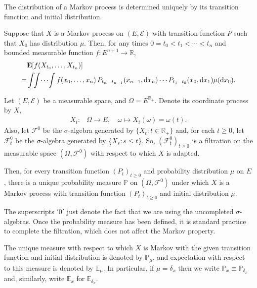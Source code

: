The distribution of a Markov process is determined uniquely by its transition function and initial distribution.

\begin{proposition}
    Suppose that \(X\) is a Markov process on \({(E,\mathcal{E})}\) with transition function \(P\) such that \({X_0}\) has distribution \(\mu\). Then, for any times \({0=t_0<t_1<\cdots<t_n}\) and bounded measurable function \({f\colon E^{n+1}\rightarrow{\mathbb R}}\),
    \begin{align*}
        &{\mathbf E}[f(X_{t_0},\ldots,X_{t_n})]\\
        =&\int\!\!\int\!\cdots\!\int f(x_0,\ldots,x_n)\,P_{t_n-t_{n-1}}(x_{n-1},\text{\rm{d}} x_n)\cdots P_{t_1-t_0}(x_0,\text{\rm{d}} x_1)\mu(\text{\rm{d}} x_0).
    \end{align*}
\end{proposition}

\begin{proposition}
    Let \({(E,\mathcal{E})}\) be a measurable space, and \({\Omega=E^{{\mathbb R}_+}}\). Denote its coordinate process by \(X\), 
    \begin{align*}
        X_t\colon&\Omega\rightarrow E, \quad \omega\mapsto X_t(\omega)=\omega(t).
    \end{align*}
    Also, let \({\mathcal{F}^0}\) be the \(\sigma\)-algebra generated by \({\{X_t\colon t\in{\mathbb R}_+\}}\) and, for each \({t\geq 0}\), let \({\mathcal{F}_t^0}\) be the \(\sigma\)-algebra generated by \({\{X_s\colon s\le t\}}\). So, \((\mathcal{F}^0_t)_{t\geq 0}\) is a filtration on the measurable space \({(\Omega,\mathcal{F}^0)}\) with respect to which \(X\) is adapted. 
    
    Then, for every transition function \((P_t)_{t\geq 0}\) and probability distribution \({\mu}\) on \(E\), there is a unique probability measure \({{\mathbb P}}\) on \({(\Omega,\mathcal{F}^0)}\) under which \(X\) is a Markov process with transition function \((P_t)_{t\geq 0}\) and initial distribution \(\mu\).
\end{proposition}
\begin{remark}
    The superscripts $'0'$ just denote the fact that we are using the uncompleted \(\sigma\)-algebras. Once the probability measure has been defined, it is standard practice to complete the filtration, which does not affect the Markov property.
\end{remark}

The unique measure with respect to which \(X\) is Markov with the given transition function and initial distribution is denoted by \({\mathbb P}_\mu\), and expectation with respect to this measure is denoted by \({\mathbb E}_\mu\). In particular, if \(\mu=\delta_x\) then we write \({\mathbb P}_x\equiv{\mathbb P}_{\delta_x}\) and, similarly, write \({\mathbb E}_x\) for \({\mathbb E}_{\delta_x}\). 


